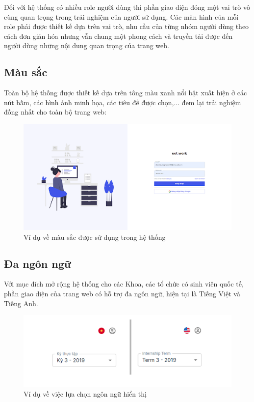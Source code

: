 \documentclass[./../main.tex]{subfiles}
\begin{document}
Đối với hệ thống có nhiều role người dùng thì phần giao diện đóng một vai trò vô cùng quan trọng trong trải nghiệm của người sử dụng. Các màn hình của mỗi role phải được thiết kế dựa trên vai trò, nhu cầu của từng nhóm người dùng theo cách đơn giản hóa nhưng vẫn chung một phong cách và truyền tải được đến người dùng những nội dung quan trọng của trang web.

\subsection{Màu sắc}
Toàn bộ hệ thống được thiết kế dựa trên tông màu xanh nổi bật xuất hiện ở các nút bấm, các hình ảnh minh họa, các tiêu đề được chọn,... đem lại trải nghiệm đồng nhất cho toàn bộ trang web:

\begin{figure}[H]
	\includegraphics[width=\linewidth]{./images/image31.png}
	\caption{Ví dụ về màu sắc được sử dụng trong hệ thống}
	\label{fig:example_color}
\end{figure}

\subsection{Đa ngôn ngữ}

Với mục đích mở rộng hệ thống cho các Khoa, các tổ chức có sinh viên quốc tế, phần giao diện của trang web có hỗ trợ đa ngôn ngữ, hiện tại là Tiếng Việt và Tiếng Anh.

\begin{figure}[H]
	\includegraphics[width=\linewidth]{./images/image30.png}
	\caption{Ví dụ về việc lựa chọn ngôn ngữ hiển thị}
	\label{fig:multiple_lang}
\end{figure}
\end{document}
